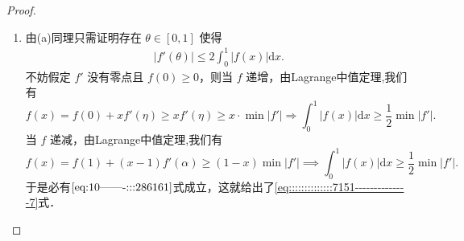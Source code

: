 \documentclass[../../main.tex]{subfiles}%
\begin{document}
\begin{proof}
\begin{enumerate}[(1)]
\item 由(a)同理只需证明存在 \( \theta \in [0,1] \) 使得
\begin{align}
|f'(\theta)| \leqslant 2 \int_0^1 |f(x)| \mathrm{d}x. \label{eq:10-------:::286161}
\end{align}
不妨假定 \( f' \) 没有零点且 \( f(0) \geqslant 0 \)，则当 \( f \) 递增，由Lagrange中值定理,我们有
\[
f(x)=f(0)+xf' (\eta )\geqslant xf' (\eta )\geqslant x\cdot \min |f' |\Longrightarrow \int_0^1{|f(x)|\mathrm{d}x} \geqslant \frac{1}{2}\min |f' |.
\]
当 \( f \) 递减，由Lagrange中值定理,我们有
\[
f(x) = f(1) + (x - 1) f'(\alpha) \geqslant (1 - x) \min |f'| \implies \int_0^1 |f(x)| \mathrm{d}x \geqslant \frac{1}{2} \min |f'|.
\]
于是必有\(\eqref{eq:10-------:::286161}\)式成立，这就给出了\eqref{eq::::::::::::::7151--------------7}式．
\end{enumerate}
\end{proof}
\end{document}
